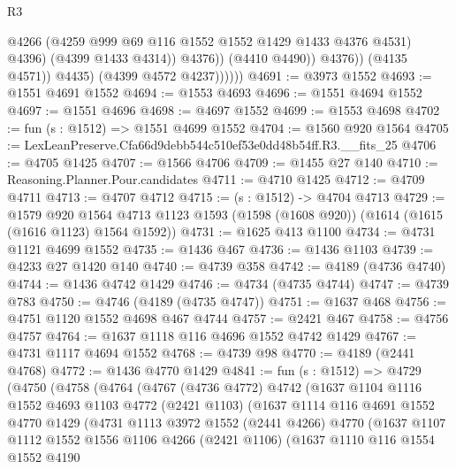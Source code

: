 \begin{lexlean}{R3}
\begin{coremodule}
                                @4266
                                (@4259 @999 @69 @116 @1552 @1552 @1429 @1433 @4376 @4531)
                                @4396)
                              (@4399 @1433 @4314))
                            @4376))
                        (@4410 @4490))
                      @4376))
                  (@4135 @4571))
                @4435)
              (@4399 @4572 @4237))))))
@4691 := @3973 @1552
@4693 := @1551 @4691 @1552
@4694 := @1553 @4693
@4696 := @1551 @4694 @1552
@4697 := @1551 @4696
@4698 := @4697 @1552
@4699 := @1553 @4698
@4702 := fun (s : @1512) => @1551 @4699 @1552
@4704 := @1560 @920 @1564
@4705 := LexLeanPreserve.Cfa66d9debb544c510ef53e0dd48b54ff.R3.__fits_25
@4706 := @4705 @1425
@4707 := @1566 @4706
@4709 := @1455 @27 @140
@4710 := Reasoning.Planner.Pour.candidates
@4711 := @4710 @1425
@4712 := @4709 @4711
@4713 := @4707 @4712
@4715 := (s : @1512) -> @4704 @4713
@4729 := @1579
    @920
    @1564
    @4713
    @1123
    @1593
    (@1598 (@1608 @920))
    (@1614 (@1615 (@1616 @1123) @1564 @1592))
@4731 := @1625 @413 @1100
@4734 := @4731 @1121 @4699 @1552
@4735 := @1436 @467
@4736 := @1436 @1103
@4739 := @4233 @27 @1420 @140
@4740 := @4739 @358
@4742 := @4189 (@4736 @4740)
@4744 := @1436 @4742 @1429
@4746 := @4734 (@4735 @4744)
@4747 := @4739 @783
@4750 := @4746 (@4189 (@4735 @4747))
@4751 := @1637 @468
@4756 := @4751 @1120 @1552 @4698 @467 @4744
@4757 := @2421 @467
@4758 := @4756 @4757
@4764 := @1637 @1118 @116 @4696 @1552 @4742 @1429
@4767 := @4731 @1117 @4694 @1552
@4768 := @4739 @98
@4770 := @4189 (@2441 @4768)
@4772 := @1436 @4770 @1429
@4841 := fun (s : @1512) =>
  @4729
    (@4750
      (@4758
        (@4764
          (@4767
            (@4736 @4772)
            @4742
            (@1637
              @1104
              @1116
              @1552
              @4693
              @1103
              @4772
              (@2421 @1103)
              (@1637
                @1114
                @116
                @4691
                @1552
                @4770
                @1429
                (@4731
                  @1113
                  @3972
                  @1552
                  (@2441 @4266)
                  @4770
                  (@1637
                    @1107
                    @1112
                    @1552
                    @1556
                    @1106
                    @4266
                    (@2421 @1106)
                    (@1637
                      @1110
                      @116
                      @1554
                      @1552
                      @4190

\end{coremodule}
\end{lexlean}
